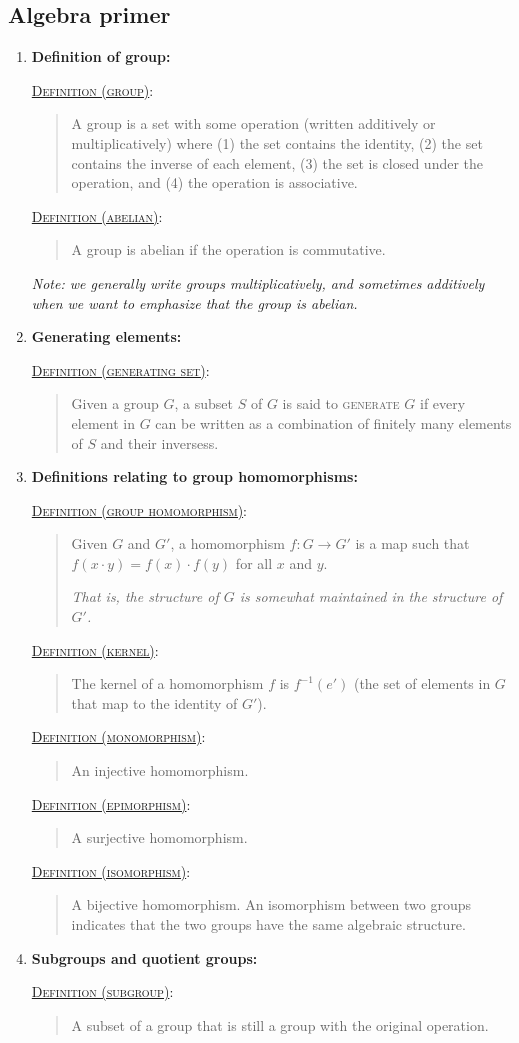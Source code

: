\documentclass[letterpaper, 12pt]{article}
\newcommand{\defn}[2]{\textsc{\underline{Definition (#1)}:}\begin{quote} #2\end{quote}}
\begin{document}
    \subsection{Algebra primer}
        \begin{enumerate}[resume]
        \item \textbf{Definition of group:}

            \defn{group}{A group is a set with some operation (written additively or multiplicatively) where (1) the set contains the identity, (2) the set contains the inverse of each element, (3) the set is closed under the operation, and (4) the operation is associative.}

            \defn{abelian}{A group is abelian if the operation is commutative.}

            \textit{Note: we generally write groups multiplicatively, and sometimes additively when we want to emphasize that the group is abelian.}
        \item \textbf{Generating elements:}

            \defn{generating set}{Given a group $G$, a subset $S$ of $G$ is said to \textsc{generate} $G$ if every element in $G$ can be written as a combination of finitely many elements of $S$ and their inversess.}
        \item \textbf{Definitions relating to group homomorphisms:}

            \defn{group homomorphism}{Given $G$ and $G'$, a homomorphism $f : G\to G'$ is a map such that $f(x\cdot y) = f(x)\cdot f(y)$ for all $x$ and $y$.

            \textit{That is, the structure of $G$ is somewhat maintained in the structure of $G'$.}}

            \defn{kernel}{The kernel of a homomorphism $f$ is $f^{-1}(e')$ (the set of elements in $G$ that map to the identity of $G'$).}

            \defn{monomorphism}{An injective homomorphism.}

            \defn{epimorphism}{A surjective homomorphism.}

            \defn{isomorphism}{A bijective homomorphism. An isomorphism between two groups indicates that the two groups have the same algebraic structure.}
        \item \textbf{Subgroups and quotient groups:}

            \defn{subgroup}{A subset of a group that is still a group with the original operation.}


\end{enumerate}
\end{document}
